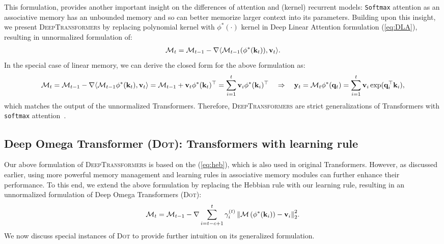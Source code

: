 This formulation, provides another important insight on the differences of attention and (kernel) recurrent models: \texttt{Softmax} attention as an associative memory has an unbounded memory and so can better memorize larger context into its parameters. Building upon this insight, we present \textsc{DeepTransformers} by replacing polynomial kernel with $\phi^{*}(\cdot)$ kernel in Deep Linear Attention formulation (\autoref{eq:DLA}), resulting in unnormalized formulation of:
\begin{align}\label{eq:DeepTransformers}
    \mathcal{M}_t = \mathcal{M}_{t-1} - \nabla  \langle \mathcal{M}_{t-1}(\phi^{*}(\mathbf{k}_t)), \mathbf{v}_t \rangle.
\end{align}
In the special case of linear memory, we can derive the closed form for the above formulation as:
\begin{align}
    \mathcal{M}_t = \mathcal{M}_{t-1} - \nabla  \langle \mathcal{M}_{t-1}\phi^{*}(\mathbf{k}_t), \mathbf{v}_t \rangle = \mathcal{M}_{t-1} + \mathbf{v}_t \phi^{*}(\mathbf{k}_t)^{\top}  = \sum_{i=1}^{t} \mathbf{v}_i \phi^{*}(\mathbf{k}_i)^{\top}  \quad \Rightarrow \quad \mathbf{y}_t = \mathcal{M}_t \phi^{*}(\mathbf{q}_t) = \sum_{i = 1}^{t} \mathbf{v}_i \exp(\mathbf{q}_i^{\top} \mathbf{k}_i ) ,
\end{align}
which matches the output of the unnormalized Transformers. Therefore, \textsc{DeepTransformers} are strict generalizations of Transformers with \texttt{softmax} attention~\citep{transformers}.

\subsection{Deep Omega Transformer (\protect \textsc{Dot}): Transformers with \learningrule{} learning rule} \label{sec:dot}
Our above formulation of \textsc{DeepTransformers} is based on the (\ref{eq:heb}), which is also used in original Transformers. However, as discussed earlier, using more powerful memory management and learning rules in associative memory modules can further enhance their performance. To this end, we extend the above formulation by replacing the Hebbian rule with our \learningrule{} learning rule, resulting in an unnormalized formulation of Deep Omega Transformers (\textsc{Dot}):
\begin{align}
     \mathcal{M}_t = \mathcal{M}_{t-1} - {\nabla \sum_{i = t - c + 1}^{t} \gamma^{(t)}_i \left\| \mathcal{M}\left(\phi^{*}(\mathbf{k}_i)\right) - \mathbf{v}_i \right\|^2_2}.
\end{align}
We now discuss special instances of \textsc{Dot} to provide further intuition on its generalized formulation. 

